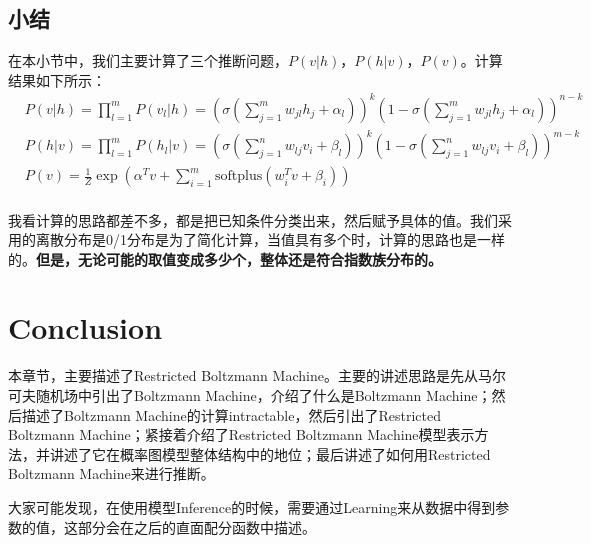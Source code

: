\documentclass[a4paper]{article}
\begin{document}
\subsection{小结}
在本小节中，我们主要计算了三个推断问题，$P(v|h)$，$P(h|v)$，$P(v)$。计算结果如下所示：
\begin{equation}
    \begin{split}
    & P(v|h) = \prod_{l=1}^m P(v_l|h) = \left( \sigma\left(\sum_{j=1}^m w_{jl}h_j + \alpha_l\right) \right)^k\left(1-\sigma\left(\sum_{j=1}^m w_{jl}h_j + \alpha_l\right)\right)^{n-k} \\
    & P(h|v) = \prod_{l=1}^m P(h_l|v) = \left( \sigma\left(\sum_{j=1}^n w_{lj}v_i + \beta_l\right) \right)^k\left(1-\sigma\left(\sum_{j=1}^n w_{lj}v_i + \beta_l\right)\right)^{m-k} \\
    & P(v)
    =  \frac{1}{Z} \exp\left(\alpha^T v + \sum_{i=1}^m \mathrm{softplus} ( w_i^{T}v+\beta_i) \right) \\
    \end{split}
\end{equation}

我看计算的思路都差不多，都是把已知条件分类出来，然后赋予具体的值。我们采用的离散分布是0/1分布是为了简化计算，当值具有多个时，计算的思路也是一样的。\textbf{但是，无论可能的取值变成多少个，整体还是符合指数族分布的。}

\section{Conclusion}
本章节，主要描述了Restricted Boltzmann Machine。主要的讲述思路是先从马尔可夫随机场中引出了Boltzmann Machine，介绍了什么是Boltzmann Machine；然后描述了Boltzmann Machine的计算intractable，然后引出了Restricted Boltzmann Machine；紧接着介绍了Restricted Boltzmann Machine模型表示方法，并讲述了它在概率图模型整体结构中的地位；最后讲述了如何用Restricted Boltzmann Machine来进行推断。

大家可能发现，在使用模型Inference的时候，需要通过Learning来从数据中得到参数的值，这部分会在之后的直面配分函数中描述。
\end{document}
